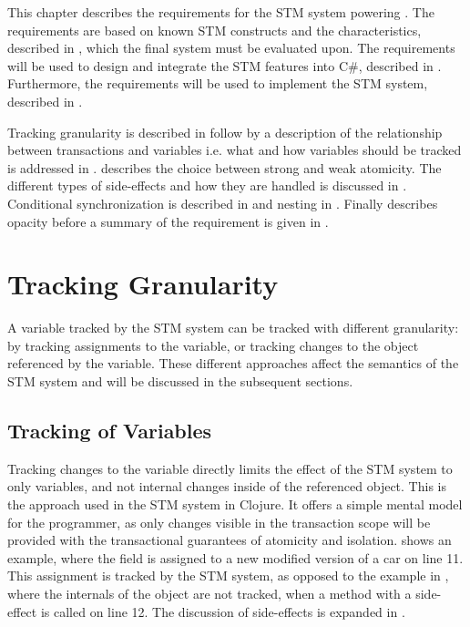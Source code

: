 \makeatletter {}\makeatother
{}
This chapter describes the requirements for the \ac{STM} system powering \stmname. The requirements are based on known \ac{STM} constructs and the characteristics, described in , which the final system must be evaluated upon. The requirements will be used to design and integrate the \ac{STM} features into C\#, described in . Furthermore, the requirements will be used to implement the \ac{STM} system, described in .

Tracking granularity is described in  follow by a description of the relationship between transactions and variables i.e. what and how variables should be tracked is addressed in .  describes the choice between strong and weak atomicity. The different types of side-effects and how they are handled is discussed in . Conditional synchronization is described in  and nesting in . Finally describes opacity before a summary of the requirement is given in .
\label{sec:stm_requirements}

\section{Tracking Granularity}\label{sec:tracking}
A variable tracked by the \ac{STM} system can be tracked with different granularity: by tracking assignments to the variable, or tracking changes to the object referenced by the variable. These different approaches affect the semantics of the \ac{STM} system and will be discussed in the subsequent sections.

\subsection{Tracking of Variables} 
Tracking changes to the variable directly limits the effect of the \ac{STM} system to only variables, and not internal changes inside of the referenced object. This is the approach used in the \ac{STM} system in Clojure\cite{clojureConcurrent}. It offers a simple mental model for the programmer, as only changes visible in the transaction scope will be provided with the transactional guarantees of atomicity and isolation.   shows an example, where the field  is assigned to a new modified version of a car on line 11. This assignment is tracked by the \ac{STM} system, as opposed to the example in , where the internals of the object are not tracked, when a method with a side-effect is called on line 12. The discussion of side-effects is expanded in .

